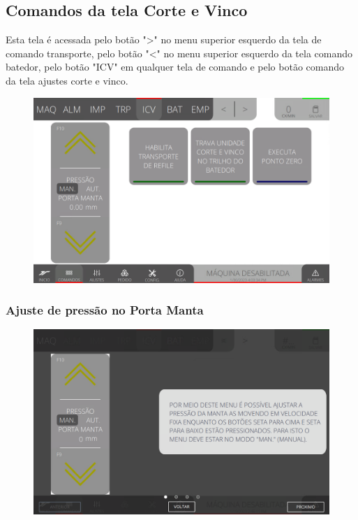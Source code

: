 \thispagestyle{fancy}
\vspace*{40 pt}
\subsection{Comandos da tela Corte e Vinco} \label{sec:comandosCorteVinco}
Esta tela é acessada pelo botão "\textgreater" no menu superior esquerdo da tela de comando transporte, pelo botão "\textless{}" no menu superior esquerdo da tela comando batedor, pelo botão "ICV" em qualquer tela de comando e pelo botão comando da tela ajustes corte e vinco.
\vspace*{\fill}
\begin{figure}[h]
    \centering
    \includegraphics[width=480 px,height=300 px]{src/imagesICV/06-dryCutter/commands/e-Tela-Principal.png}
\end{figure}
\vspace*{\fill}

\newpage
\thispagestyle{fancy}
\vspace*{40 pt}
\subsubsection{\small{Ajuste de pressão no Porta Manta}} \label{sec:comandosCorteVincoAjustePressaoPortaManta}
\vspace*{\fill}
\begin{figure}[h]
    \centering
    \includegraphics[width=576 px,height=360 px]{src/imagesICV/06-dryCutter/commands/e-1.png}
\end{figure}
\vspace*{\fill}

